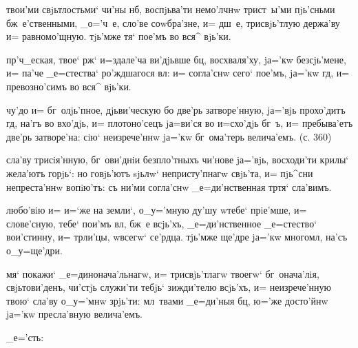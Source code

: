   твои'ми свjьтлостьми` чи'ны 
нб, воспjьва'ти немо'лчнw трист~ы'ми пjь'сньми 
бж~е'ственными, _о='ч~е, сло'ве соwбра'зне, и= дш~е, 
трисвjь'тлую держа'ву и= равномо'щную. тjь'мже тя` пое'мъ 
во вся^ вjь'ки.

   пр'ч_еская, твое` 
рж` и=здале'ча ви'дjьвше бц, восхваля'ху, jа='кw 
без\ъ сjь'мене, и= па'че _е=стества` ро'ждшагося вл: 
и= согла'снw сего` пое'мъ, jа='кw гд, и= превозно'симъ 
во вся^ вjь'ки.


  чу'до и= бг~олjь'пное, 
дjьви'ческую бо две'рь затворе'нную, jа='вjь прохо'дитъ 
гд, на'гъ во вхо'дjь, и= плотоно'сецъ jа=ви'ся во 
и=схо'дjь бг~ъ, и= пребыва'етъ две'рь затворе'на: сiю` 
неизрече'ннw jа='кw бг~ома'терь велича'емъ. (с. 360)

 сла'ву трисiя'нную, бг~ови'днiи 
безпло'тныхъ чи'нове jа='вjь, восходи'ти крилы` жела'ютъ 
горjь`: но говjь'ютъ sjьлw` непристу'пнагw свjь'та, и= 
пjь^сни непреста'ннw вопiю'тъ: съ ни'ми согла'снw 
_е=ди'нственная тр тя` сла'вимъ. 

  любо'вiю и= и=`же на земли`, 
о_у='мную ду'шу w\т тебе` прiе'мше, и= слове'сную, тебе` 
пои'мъ вл, бж~е всjь'хъ, _е=ди'нственное _е=стество` 
вои'стинну, и= тр ли'цы, w\т всегw` се'рдца. 
тjь'мже ще'дре jа='кw многомл, на'съ о_у=ще'дри.

   мя` покажи` _е=динонача'льнагw, 
и= трисвjь'тлагw твоегw` бг~онача'лiя, свjьтови'денъ, 
чи'стjь служи'ти тебjь` зижди'телю всjь'хъ, и= 
неизрече'нную твою` сла'ву о_у='мнw зрjь'ти: мл~твами 
_е=ди'ныя бц, ю='же досто'йнw jа='кw пресла'вную 
велича'емъ.

     
_е='сть: 
